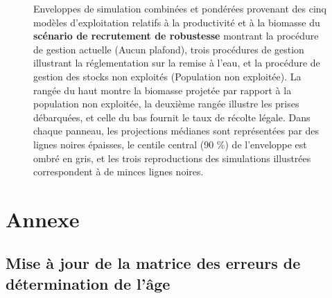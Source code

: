 \documentclass[11pt]{book}
\begin{document}
\begin{turn}
\newpage
\begin{figure}[htb]

{\centering {} 

}

\caption{Enveloppes de simulation combinées et pondérées provenant des cinq modèles d’exploitation relatifs à la productivité et à la biomasse du \textbf{scénario de recrutement de robustesse} montrant la procédure de gestion actuelle (Aucun plafond), trois procédures de gestion illustrant la réglementation sur la remise à l’eau, et la procédure de gestion des stocks non exploités (Population non exploitée). La rangée du haut montre la biomasse projetée par rapport à la population non exploitée, la deuxième rangée illustre les prises débarquées, et celle du bas fournit le taux de récolte légale. Dans chaque panneau, les projections médianes sont représentées par des lignes noires épaisses, le centile central (90 \%) de l’enveloppe est ombré en gris, et les trois reproductions des simulations illustrées correspondent à de minces lignes noires.}\label{fig:unnamed-chunk-26}
\end{figure}
\end{turn}
\hypertarget{annexe}{%
\section{\texorpdfstring{Annexe \label{sec:app-minor}}{Annexe }}\label{annexe}}

\hypertarget{mise-uxe0-jour-de-la-matrice-des-erreurs-de-duxe9termination-de-luxe2ge}{%
\subsection{Mise à jour de la matrice des erreurs de détermination de l'âge}\label{mise-uxe0-jour-de-la-matrice-des-erreurs-de-duxe9termination-de-luxe2ge}}
\end{document}
